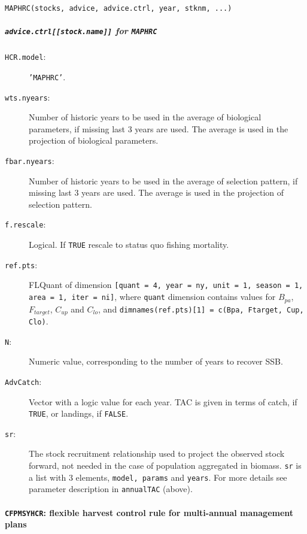 	\begin{center}
		\texttt{MAPHRC(stocks, advice, advice.ctrl, year, stknm, ...)}
	\end{center}

	\subparagraph{\texttt{advice.ctrl[[stock.name]]} for \texttt{MAPHRC}}

	  \begin{description}
	    \item[\texttt{HCR.model}:] \texttt{'MAPHRC'}.
		  \item[\texttt{wts.nyears}:] Number of historic years to be used in the average of biological parameters, if missing last 3 years are used. The average is used in the projection of biological parameters.
		  \item[\texttt{fbar.nyears}:] Number of historic years to be used in the average of selection pattern, if missing last 3 years are used. The average is used in the projection of selection pattern.
		  \item[\texttt{f.rescale}:] Logical.  If \texttt{TRUE} rescale to status quo fishing mortality.
		  \item[\texttt{ref.pts}:] FLQuant of dimension \texttt{[quant = 4, year = ny, unit = 1, season = 1, area = 1, iter = ni]}, 
		    where \texttt{quant} dimension contains values for $B_{pa}$, $F_{target}$, $C_{up}$ and $C_{lo}$, 
		    and \texttt{dimnames(ref.pts)[1] = c(Bpa, Ftarget, Cup, Clo)}.
		  \item[\texttt{N}:]  Numeric value, corresponding to the number of years to recover SSB.
		  \item[\texttt{AdvCatch}:] Vector with a logic value for each year. TAC is given in terms of catch, if \texttt{TRUE}, or landings, if \texttt{FALSE}.
		  \item[\texttt{sr}:] The stock recruitment relationship used to project the observed stock forward, not needed in the case of population aggregated in biomass. \texttt{sr} is a list with 3 elements, \texttt{model, params} and \texttt{years}. For more details see parameter description in \texttt{annualTAC} (above).
	\end{description}


  \paragraph{\texttt{CFPMSYHCR}: flexible harvest control rule for multi-annual management plans} \hspace{0pt} \smallskip


